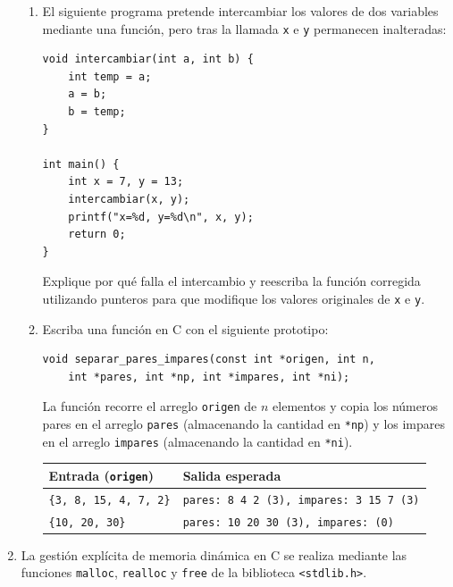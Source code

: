 \documentclass[11pt,letterpaper]{article}
\begin{document}
\begin{enumerate}[label=\textbf{\arabic*.}]
\begin{enumerate}[label=(\alph*)]
        \item El siguiente programa pretende intercambiar los valores de dos variables mediante una función, pero tras la llamada \texttt{x} e \texttt{y} permanecen inalteradas:
        \begin{lstlisting}[style=customc]
void intercambiar(int a, int b) {
    int temp = a;
    a = b;
    b = temp;
}

int main() {
    int x = 7, y = 13;
    intercambiar(x, y);
    printf("x=%d, y=%d\n", x, y);
    return 0;
}
        \end{lstlisting}
        Explique por qué falla el intercambio y reescriba la función corregida utilizando punteros para que modifique los valores originales de \texttt{x} e \texttt{y}.

        \item Escriba una función en C con el siguiente prototipo:
        \begin{lstlisting}[style=customc, numbers=none]
void separar_pares_impares(const int *origen, int n,
    int *pares, int *np, int *impares, int *ni);
        \end{lstlisting}
        La función recorre el arreglo \texttt{origen} de $n$ elementos y copia los números pares en el arreglo \texttt{pares} (almacenando la cantidad en \texttt{*np}) y los impares en el arreglo \texttt{impares} (almacenando la cantidad en \texttt{*ni}).

        \begin{center}
        \begin{tabular}{ll}
        \toprule
        \textbf{Entrada (\texttt{origen})} & \textbf{Salida esperada} \\
        \midrule
        \texttt{\{3, 8, 15, 4, 7, 2\}} & \texttt{pares: 8 4 2 (3), impares: 3 15 7 (3)} \\
        \texttt{\{10, 20, 30\}} & \texttt{pares: 10 20 30 (3), impares: (0)} \\
        \bottomrule
        \end{tabular}
        \end{center}
        \vspace{3.5cm}
    \end{enumerate}

    \newpage

    \item La gestión explícita de memoria dinámica en C se realiza mediante las funciones \texttt{malloc}, \texttt{realloc} y \texttt{free} de la biblioteca \texttt{<stdlib.h>}.


\end{enumerate}
\end{document}

